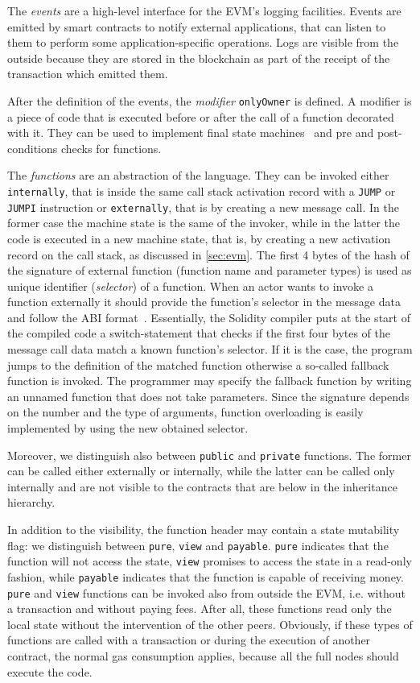 The \emph{events} are a high-level interface for the EVM's logging facilities.
Events are emitted by smart contracts to notify external applications, that can
listen to them to perform some application-specific operations. Logs are visible
from the outside because they are stored in the blockchain as part of the
receipt of the transaction which emitted them.

After the definition of the events, the \emph{modifier} \verb|onlyOwner| is
defined. A modifier is a piece of code that is executed before or after the call
of a function decorated with it. They can be used to implement final state
machines~\cite{bib:solidity-docs} and pre and post-conditions checks for
functions.

The \emph{functions} are an abstraction of the language. They can be invoked
either \texttt{internally}, that is inside the same call stack activation record
with a \texttt{JUMP} or \texttt{JUMPI} instruction or \texttt{externally}, that
is by creating a new message call. In the former case the machine state is the
same of the invoker, while in the latter the code is executed in a new machine
state, that is, by creating a new activation record on the call stack, as
discussed in \autoref{sec:evm}. The first 4 bytes of the hash of the signature
of external function (function name and parameter types) is used as unique
identifier (\emph{selector}) of a function. When an actor wants to invoke a
function externally it should provide the function's selector in the message
data and follow the ABI format~\cite{bib:solidity-docs}. Essentially, the
Solidity compiler puts at the start of the compiled code a switch-statement that
checks if the first four bytes of the message call data match a known function's
selector. If it is the case, the program jumps to the definition of the matched
function otherwise a so-called fallback function is invoked. The programmer may
specify the fallback function by writing an unnamed function that does not take
parameters. Since the signature depends on the number and the type of arguments,
function overloading is easily implemented by using the new obtained selector.

Moreover, we distinguish also between \texttt{public} and \texttt{private}
functions. The former can be called either externally or internally, while the
latter can be called only internally and are not visible to the contracts that
are below in the inheritance hierarchy.

In addition to the visibility, the function header may contain a state
mutability flag: we distinguish between \texttt{pure}, \texttt{view} and
\texttt{payable}. \texttt{pure} indicates that the function will not access the
state, \texttt{view} promises to access the state in a read-only fashion, while
\texttt{payable} indicates that the function is capable of receiving money.
\texttt{pure} and \texttt{view} functions can be invoked also from outside the
EVM, i.e. without a transaction and without paying fees. After all, these
functions read only the local state without the intervention of the other peers.
Obviously, if these types of functions are called with a transaction or during
the execution of another contract, the normal gas consumption applies, because
all the full nodes should execute the code.
